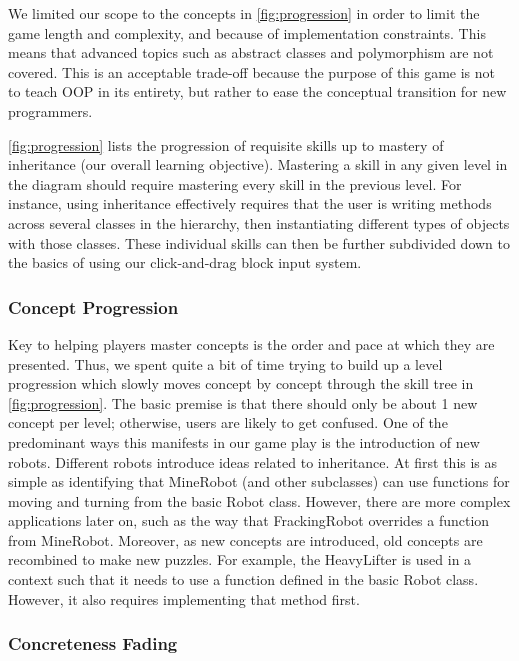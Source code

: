 \documentclass[12pt,notitlepage]{article}
\begin{document}
We limited our scope to the concepts in \autoref{fig:progression} in
order to limit the game length and complexity, and because of
implementation constraints. This means that advanced topics such as
abstract classes and polymorphism are not covered. This is an
acceptable trade-off because the purpose of this game is not to teach
OOP in its entirety, but rather to ease the conceptual transition for
new programmers.

\autoref{fig:progression} lists the progression of requisite skills up
to mastery of inheritance (our overall learning objective). Mastering
a skill in any given level in the diagram should require mastering
every skill in the previous level. For instance, using inheritance
effectively requires that the user is writing methods across several
classes in the hierarchy, then instantiating different types of objects
with those classes. These individual skills can then be further subdivided
down to the basics of using our click-and-drag block input system.


\subsubsection{Concept Progression}

Key to helping players master concepts is the order and pace at which
they are presented. Thus, we spent quite a bit of time trying to build
up a level progression which slowly moves concept by concept through
the skill tree in \autoref{fig:progression}. The basic premise is that
there should only be about 1 new concept per level; otherwise, users
are likely to get confused. One of the predominant ways this manifests
in our game play is the introduction of new robots. Different robots
introduce ideas related to inheritance. At first this is as simple as
identifying that MineRobot (and other subclasses) can use functions
for moving and turning from the basic Robot class. However, there are
more complex applications later on, such as the way that FrackingRobot
overrides a function from MineRobot. Moreover, as new concepts are
introduced, old concepts are recombined to make new puzzles. For
example, the HeavyLifter is used in a context such that it needs to
use a function defined in the basic Robot class. However, it also
requires implementing that method first.

\subsubsection{Concreteness Fading}
\end{document}
